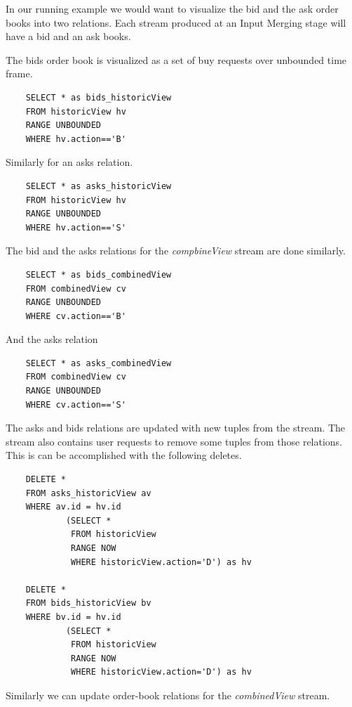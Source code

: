 \documentclass{article}
\begin{document}
In our running example we would want to visualize the bid and the ask order books into two relations. Each stream produced at an Input Merging stage will have a bid and an ask books.

The bids order book is visualized as a set of buy requests over unbounded time frame.

\begin{verbatim}  
    SELECT * as bids_historicView
    FROM historicView hv
    RANGE UNBOUNDED
    WHERE hv.action=='B'
\end{verbatim}

\noindent Similarly for an asks relation.

\begin{verbatim}  
    SELECT * as asks_historicView
    FROM historicView hv
    RANGE UNBOUNDED
    WHERE hv.action=='S'
\end{verbatim}

\noindent The bid and the asks relations for the \emph{compbineView} stream are done similarly.

\begin{verbatim}  
    SELECT * as bids_combinedView
    FROM combinedView cv
    RANGE UNBOUNDED
    WHERE cv.action=='B'
\end{verbatim}

\noindent And the asks relation

\begin{verbatim}  
    SELECT * as asks_combinedView
    FROM combinedView cv
    RANGE UNBOUNDED
    WHERE cv.action=='S'
\end{verbatim}

\noindent The asks and bids relations are updated with new tuples from the stream. The stream also contains user requests to remove some tuples from those relations. This is can be accomplished with the following deletes.

\begin{verbatim}  
    DELETE *
    FROM asks_historicView av
    WHERE av.id = hv.id
            (SELECT * 
             FROM historicView
             RANGE NOW
             WHERE historicView.action='D') as hv  

    DELETE *
    FROM bids_historicView bv
    WHERE bv.id = hv.id
            (SELECT * 
             FROM historicView
             RANGE NOW
             WHERE historicView.action='D') as hv 
\end{verbatim}

Similarly we can update order-book relations for the \emph{combinedView} stream.
\end{document}
